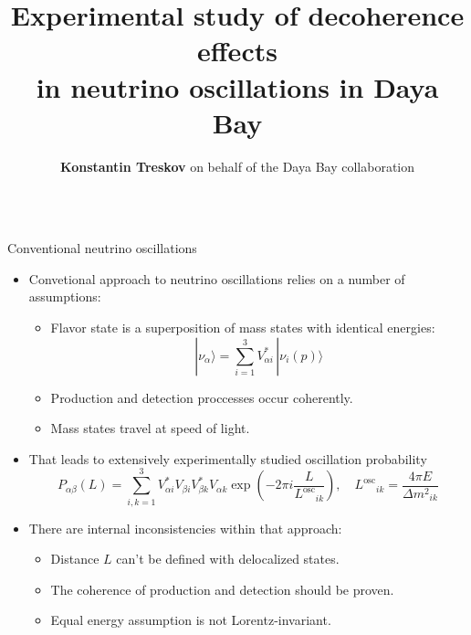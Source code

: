 \documentclass[usenames, dvipsnames]{beamer}
\author[]{\textbf{Konstantin Treskov} on behalf of the Daya Bay collaboration}
\title{Experimental study of decoherence effects\\ in neutrino oscillations in
Daya Bay}
\institute{Joint Institute for Nuclear Research, Dubna, Russia}
\newcommand{\Losc}{\ensuremath{L^{\text{osc}}}}
\newcommand{\Dm}{\ensuremath{\Delta m^2}}
\newcommand{\Important}{\textcolor{BrickRed}}
\newcommand{\Regular}{\textcolor{DeepBlue}}
\newcommand{\regitem}{\item[\Regular{$\bullet$}]}
\newcommand{\impitem}{\item[\Important{$\bullet$}]}
\begin{document}
\begin{frame}[fragile]
\begin{columns}[T]

    \hspace*{-2.5cm}
\begin{column}{.47\textwidth}
\begin{block}{Conventional neutrino oscillations}
\begin{itemize}
    \regitem Convetional approach to neutrino oscillations relies on a number of
        assumptions:
        \begin{itemize}
            \item Flavor state is a superposition of mass states with
                identical energies:
                \begin{equation*}
                    | \nu_\alpha \rangle = \sum_{i=1}^{3} V^*_{\alpha i}\, |
                    \nu_i(p) \rangle
                \end{equation*}
            \item Production and detection proccesses occur coherently.
            \item Mass states travel at speed of light.
        \end{itemize}
    \item That leads to extensively experimentally studied oscillation probability
    \begin{equation*}
        P_{\alpha\beta}(L) = \sum_{i,k=1}^3 V^*_{\alpha i} V_{\beta i}
        V^*_{\beta k}
        V_{\alpha k} \exp \left( - 2\pi i  \frac{L}{\Losc_{ik}}\right), \quad
        \ensuremath{\Losc_{ik} = \dfrac{4 \pi E}{\Dm_{ik}}}
    \end{equation*}
    \impitem There are internal inconsistencies within that approach:
        \begin{itemize}
            \item  Distance \ensuremath{L} can't be defined with delocalized
                states.
            \item The coherence of production and detection should be proven.
            \item Equal energy assumption is not Lorentz-invariant.
        \end{itemize}
\end{itemize}
\end{block}


\end{column}
\end{columns}
\end{frame}
\end{document}
